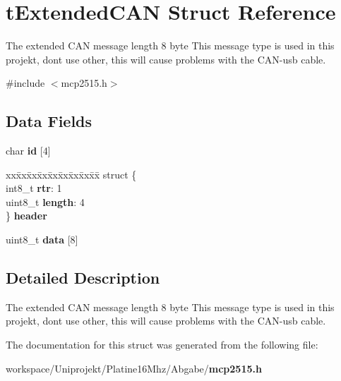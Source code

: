 \section{t\-Extended\-C\-A\-N \-Struct \-Reference}
\label{structt_extended_c_a_n}


\-The extended \-C\-A\-N message length 8 byte \-This message type is used in this projekt, dont use other, this will cause problems with the \-C\-A\-N-\/usb cable.  




{\ttfamily \#include $<$mcp2515.\-h$>$}

\subsection*{\-Data \-Fields}
\begin{DoxyCompactItemize}
\item 
char {\bfseries id} [4]\label{group__can_gace593da5319500315498c8f845ee2368}

\item 
\begin{tabbing}
xx\=xx\=xx\=xx\=xx\=xx\=xx\=xx\=xx\=\kill
struct \{\\
\>int8\_t {\bfseries rtr}: 1\\
\>uint8\_t {\bfseries length}: 4\\
\} {\bfseries header}\label{group__can_ga16dcd6dee09e1abfcc9597f67b3b2c32}
\\

\end{tabbing}\item 
uint8\-\_\-t {\bfseries data} [8]\label{group__can_gafb87d045bbf32b236fc425efe02bdc7b}

\end{DoxyCompactItemize}


\subsection{\-Detailed \-Description}
\-The extended \-C\-A\-N message length 8 byte \-This message type is used in this projekt, dont use other, this will cause problems with the \-C\-A\-N-\/usb cable. 

\-The documentation for this struct was generated from the following file\-:\begin{DoxyCompactItemize}
\item 
workspace/\-Uniprojekt/\-Platine16\-Mhz/\-Abgabe/{\bf mcp2515.\-h}\end{DoxyCompactItemize}
